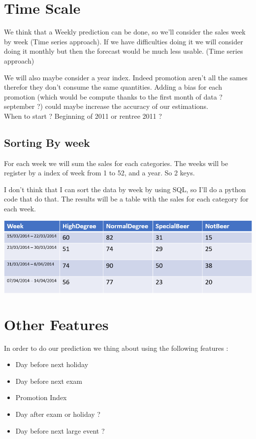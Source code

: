 \documentclass{report}
\begin{document}
\section{Time Scale}

We think that a Weekly prediction can be done, so we'll consider the sales week by week (Time series approach). If we have difficulties doing it we will consider doing it monthly but then the forecast would be much less usable. (Time series approach)

We will also maybe consider a year index. Indeed promotion aren't all the sames therefor they don't consume the same quantities. Adding a bias for each promotion (which would be compute thanks to the first month of data ? september ?) could maybe increase the accuracy of our estimations.\\
When to start ? Beginning of 2011 or rentree 2011 ?

\subsection{Sorting By week}

For each week we will sum the sales for each categories. The weeks will be register by a index of week from 1 to 52, and a year. So 2 keys. 

I don't think that I can sort the data by week by using SQL, so I'll do a python code that do that. The results will be a table with the sales for each category for each week.


\includegraphics[scale = 0.8]{FormatTable}

\section{Other Features}

In order to do our prediction we thing about using the following features :
\begin{itemize}
\item Day before next holiday 
\item Day before next exam
\item Promotion Index
\item Day after exam or holiday ?
\item Day before next large event ?
\end{itemize}
\end{document}
